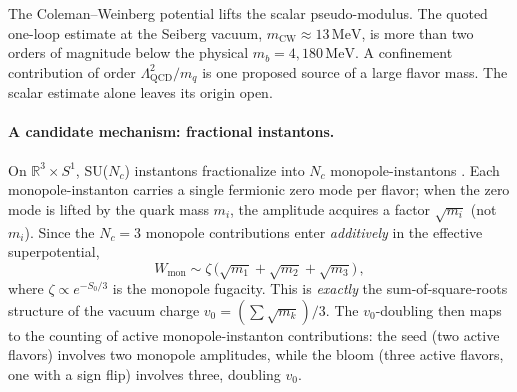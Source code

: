 \documentclass[12pt,a4paper]{article}
\newcommand{\MeV}{\,\text{MeV}}
\begin{document}
The Coleman--Weinberg potential lifts the scalar pseudo-modulus.
The quoted one-loop estimate at the Seiberg vacuum,
$m_{\text{CW}}\approx13\MeV$, is more than two orders of magnitude
below the physical $m_b=4{,}180\MeV$. A confinement contribution of
order $\Lambda_{\text{QCD}}^2/m_q$ is one proposed source of a large
flavor mass. The scalar estimate alone leaves its origin open.

\paragraph{A candidate mechanism: fractional instantons.}
On $\mathbb{R}^3 \times S^1$, SU($N_c$) instantons fractionalize into
$N_c$ monopole-instantons \cite{Unsal2008}. Each monopole-instanton
carries a single fermionic zero mode per flavor; when the zero mode is
lifted by the quark mass $m_i$, the amplitude acquires a factor
$\sqrt{m_i}$ (not $m_i$). Since the $N_c = 3$ monopole contributions
enter \emph{additively} in the effective superpotential,
\begin{equation*}
  W_{\text{mon}} \sim \zeta\,\bigl(\sqrt{m_1} + \sqrt{m_2} + \sqrt{m_3}\bigr)\,,
\end{equation*}
where $\zeta \propto e^{-S_0/3}$ is the monopole fugacity. This is
\emph{exactly} the sum-of-square-roots structure of the vacuum charge
$v_0 = (\sum \sqrt{m_k})/3$.
The $v_0$-doubling then maps to the counting of active
monopole-instanton contributions: the seed (two active flavors) involves
two monopole amplitudes, while the bloom (three active flavors, one with
a sign flip) involves three, doubling $v_0$.
\end{document}
